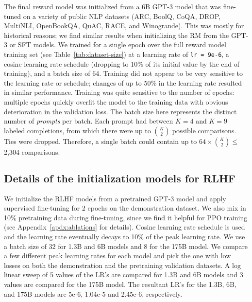 \documentclass{article}
\begin{document}
The final reward model was initialized from a 6B GPT-3 model that was fine-tuned on a variety of public NLP datasets (ARC, BoolQ, CoQA, DROP, MultiNLI, OpenBookQA, QuAC, RACE, and Winogrande). This was mostly for historical reasons; we find similar results when initializing the RM from the GPT-3 or SFT models. We trained for a single epoch over the full reward model training set (see Table~\ref{tab:dataset-size}) at a learning rate of \texttt{lr = 9e-6}, a cosine learning rate schedule (dropping to 10\% of its initial value by the end of training), and a batch size of 64. Training did not appear to be very sensitive to the learning rate or schedule; changes of up to 50\% in the learning rate resulted in similar performance. Training was quite sensitive to the number of epochs: multiple epochs quickly overfit the model to the training data with obvious deterioration in the validation loss. The batch size here represents the distinct number of \emph{prompts} per batch. Each prompt had between $K=4$ and $K=9$ labeled completions, from which there were up to $K \choose 2$ possible comparisons. Ties were dropped. Therefore, a single batch could contain up to $64 \times {K \choose 2} \leq$ 2,304 comparisons.

\subsection{Details of the initialization models for RLHF}
We initialize the RLHF models from a pretrained GPT-3 model and apply supervised fine-tuning for 2 epochs on the demonstration dataset.  We also mix in 10\% pretraining data during fine-tuning, since we find it helpful for PPO training (see Appendix~\ref{apdx:ablations} for details). Cosine learning rate schedule is used and the learning rate eventually decays to 10\% of the peak learning rate. We use a batch size of 32 for 1.3B and 6B models and 8 for the 175B model. We compare a few different peak learning rates for each model and pick the one with low losses on both the demonstration and the pretraining validation datasets. A log linear sweep of 5 values of the LR's are compared for 1.3B and 6B models and 3 values are compared for the 175B model. The resultant LR's for the 1.3B, 6B, and 175B models are 5e-6, 1.04e-5 and 2.45e-6, respectively.
\end{document}
